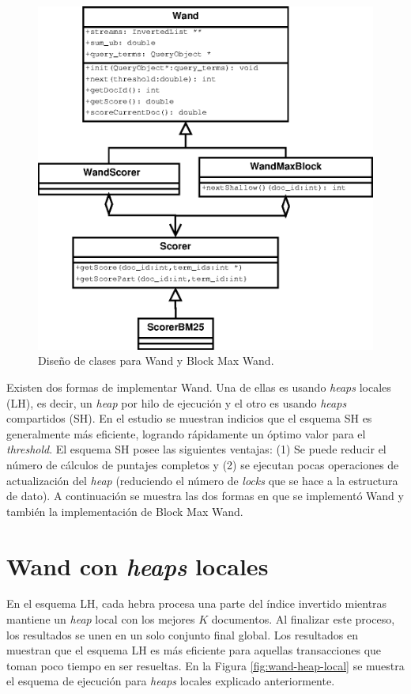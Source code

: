 \begin{figure}[tp]
\centering
\includegraphics[scale=.75]{images/WAND.eps}
\caption{Diseño de clases para Wand y Block Max Wand.}
\label{fig:diagramawand}
\end{figure}

Existen dos formas de implementar Wand. Una de ellas es usando \textit{heaps} locales (LH), es decir, un \textit{heap} por hilo de ejecución y el otro es usando \textit{heaps} compartidos (SH). En el estudio \citep{Rojas:2013} se muestran indicios que el esquema SH es generalmente más eficiente, logrando rápidamente un óptimo valor para el \textit{threshold}. El esquema SH posee las siguientes ventajas: (1) Se puede reducir el número de cálculos de puntajes completos y (2) se ejecutan pocas operaciones de actualización del \textit{heap} (reduciendo el número de \textit{locks} que se hace a la estructura de dato). 
A continuación se muestra las dos formas en que se implementó Wand y también la implementación de Block Max Wand.


\section{Wand con \textit{heaps} locales}
\label{scheduling:wlh}
En el esquema LH, cada hebra procesa una parte del índice invertido mientras mantiene un \textit{heap} local con los mejores $K$ documentos. Al finalizar este proceso, los resultados se unen en un solo conjunto final global. Los resultados en \citep{Rojas:2013} muestran que el esquema LH es más eficiente para aquellas transacciones que toman poco tiempo en ser resueltas. En la Figura \ref{fig:wand-heap-local} se muestra el esquema de ejecución para \textit{heaps} locales explicado anteriormente. 

